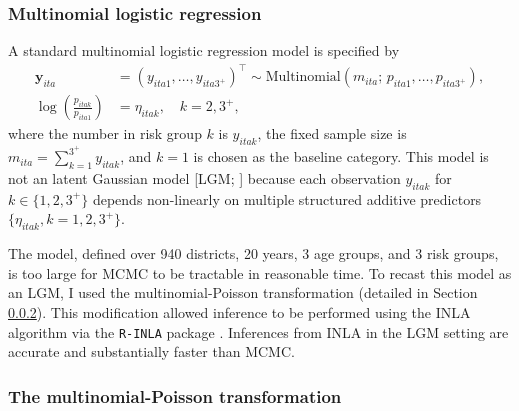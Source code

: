 \documentclass[a4paper, nobind]{templates/ociamthesis}
\begin{document}
\hypertarget{multinomial-logistic-regression}{%
\subsubsection{Multinomial logistic regression}\label{multinomial-logistic-regression}}

A standard multinomial logistic regression model \autocite[e.g.][]{gelman2013bayesian} is specified by
\begin{align}
    \mathbf{y}_{ita} &= (y_{ita1}, \ldots, y_{ita3^{+}})^\top \sim \text{Multinomial}(m_{ita}; \, p_{ita1}, \ldots, p_{ita3^{+}}), \label{eq:mlr1} \\
    \log \left( \frac{p_{itak}}{p_{ita1}} \right) &= \eta_{itak}, \quad k = 2, 3^{+}, \label{eq:mlr2}
\end{align}
where the number in risk group \(k\) is \(y_{itak}\), the fixed sample size is \(m_{ita} = \sum_{k = 1}^{3^{+}} y_{itak}\), and \(k = 1\) is chosen as the baseline category.
This model is not an latent Gaussian model {[}LGM; \textcite{rue2009approximate}{]} because each observation \(y_{itak}\) for \(k \in \{1, 2, 3^{+}\}\) depends non-linearly on multiple structured additive predictors \(\{\eta_{itak}, k = 1, 2, 3^{+}\}\).

The model, defined over 940 districts, 20 years, 3 age groups, and 3 risk groups, is too large for MCMC to be tractable in reasonable time.
To recast this model as an LGM, I used the multinomial-Poisson transformation (detailed in Section \ref{mp-transformation}).
This modification allowed inference to be performed using the INLA \autocite{rue2009approximate} algorithm via the \texttt{R-INLA} package \autocite{martins2013bayesian}.
Inferences from INLA in the LGM setting are accurate and substantially faster than MCMC.

\hypertarget{mp-transformation}{%
\subsubsection{The multinomial-Poisson transformation}\label{mp-transformation}}
\end{document}
